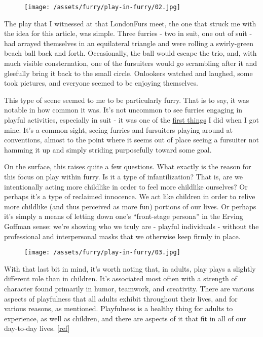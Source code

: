 \begin{figure}[htbp]
\centering
\texttt{[image: /assets/furry/play-in-furry/02.jpg]}
\caption{}
\end{figure}

The play that I witnessed at that LondonFurs meet, the one that struck
me with the idea for this article, was simple. Three furries - two in
suit, one out of suit - had arrayed themselves in an equilateral
triangle and were rolling a swirly-green beach ball back and forth.
Occasionally, the ball would escape the trio, and, with much visible
consternation, one of the fursuiters would go scrambling after it and
gleefully bring it back to the small circle. Onlookers watched and
laughed, some took pictures, and everyone seemed to be enjoying
themselves.

This type of scene seemed to me to be particularly furry. That is to
say, it was notable in how common it was. It's not uncommon to see
furries engaging in playful activities, especially in suit - it was one
of the \href{https://www.youtube.com/watch?v=PMFdVIE3Zj0}{first things}
I did when I got mine. It's a common sight, seeing furries and
fursuiters playing around at conventions, almost to the point where it
seems out of place seeing a fursuiter not hamming it up and simply
striding purposefully toward some goal.

On the surface, this raises quite a few questions. What exactly is the
reason for this focus on play within furry. Is it a type of
infantilization? That is, are we intentionally acting more childlike in
order to feel more childlike ourselves? Or perhaps it's a type of
reclaimed innocence. We act like children in order to relive more
childlike (and thus perceived as more fun) portions of our lives. Or
perhaps it's simply a means of letting down one's ``front-stage
persona'' in the Erving Goffman sense: we're showing who we truly are -
playful individuals - without the professional and interpersonal masks
that we otherwise keep firmly in place.

\begin{figure}[htbp]
\centering
\texttt{[image: /assets/furry/play-in-furry/03.jpg]}
\caption{}
\end{figure}

With that last bit in mind, it's worth noting that, in adults, play
plays a slightly different role than in children. It's associated most
often with a strength of character found primarily in humor, teamwork,
and creativity. There are various aspects of playfulness that all adults
exhibit throughout their lives, and for various reasons, as mentioned.
Playfulness is a healthy thing for adults to experience, as well as
children, and there are aspects of it that fit in all of our day-to-day
lives. {[}\href{http://www.psywb.com/content/1/1/4}{ref}{]}

